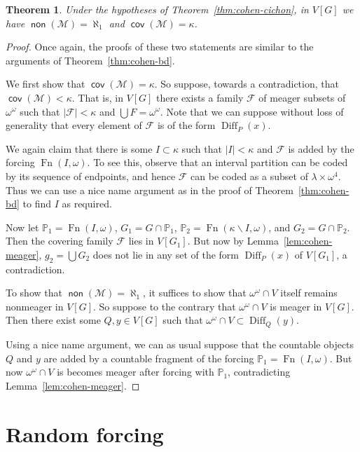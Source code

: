 \documentclass[11pt,oneside]{amsbook}
\newcommand{\PP}{\mathbb P}
\newcommand{\Meager}{\mathcal M}
\DeclareMathOperator{\non}{\mathsf{non}}
\DeclareMathOperator{\cov}{\mathsf{cov}}
\DeclareMathOperator{\Diff}{Diff}
\DeclareMathOperator{\Fn}{Fn}
\theoremstyle{definition}
\theoremstyle{plain}
\newtheorem{thm}{Theorem}[section]
\theoremstyle{definition}
\theoremstyle{remark}
\numberwithin{equation}{section}
\numberwithin{figure}{section}
\begin{document}
\begin{thm}
  \label{thm:cohen-meager}
  Under the hypotheses of Theorem~\ref{thm:cohen-cichon}, in $V[G]$ we have $\non(\Meager)=\aleph_1$ and $\cov(\Meager)=\kappa$.
\end{thm}

\begin{proof}
 Once again, the proofs of these two statements are similar to the arguments of Theorem~\ref{thm:cohen-bd}.

  We first show that $\cov(\Meager)=\kappa$. So suppose, towards a contradiction, that $\cov(\Meager)<\kappa$. That is, in $V[G]$ there exists a family $\mathcal F$ of meager subsets of $\omega^\omega$ such that $|\mathcal F|<\kappa$ and $\bigcup F=\omega^\omega$.  Note that we can suppose without loss of generality that every element of $\mathcal F$ is of the form $\Diff_P(x)$.

  We again claim that there is some $I\subset\kappa$ such that $|I|<\kappa$ and $\mathcal F$ is added by the forcing $\Fn(I,\omega)$. To see this, observe that an interval partition can be coded by its sequence of endpoints, and hence $\mathcal F$ can be coded as a subset of $\lambda\times\omega^4$. Thus we can use a nice name argument as in the proof of Theorem~\ref{thm:cohen-bd} to find $I$ as required.

  Now let $\PP_1=\Fn(I,\omega)$, $G_1=G\cap\PP_1$, $\PP_2=\Fn(\kappa\smallsetminus I,\omega)$, and $G_2=G\cap\PP_2$. Then the covering family $\mathcal F$ lies in $V[G_1]$. But now by Lemma~\ref{lem:cohen-meager}, $g_2=\bigcup G_2$ does not lie in any set of the form $\Diff_P(x)$ of $V[G_1]$, a contradiction.

  To show that $\non(\Meager)=\aleph_1$, it suffices to show that $\omega^\omega\cap V$ itself remains nonmeager in $V[G]$. So suppose to the contrary that $\omega^\omega\cap V$ is meager in $V[G]$. Then there exist some $Q,y\in V[G]$ such that $\omega^\omega\cap V\subset\Diff_Q(y)$.

  Using a nice name argument, we can as usual suppose that the countable objects $Q$ and $y$ are added by a countable fragment of the forcing $\PP_1=\Fn(I,\omega)$. But now $\omega^\omega\cap V$ is becomes meager after forcing with $\PP_1$, contradicting Lemma~\ref{lem:cohen-meager}.
\end{proof}



\section{Random forcing}
\end{document}
